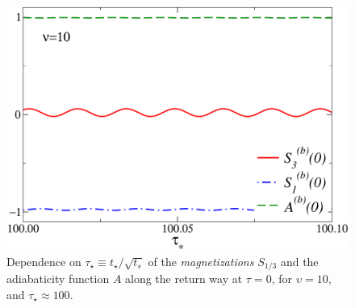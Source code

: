 \begin{figure}[!htb]
  \centering
  \includegraphics[width=0.55\columnwidth]{imm/oscillation3b.pdf}
  \caption{Dependence on $\tau_\star\equiv t_\star/\sqrt{t_s}$ of the
    {\em magnetizations} $S_{1/3}$ and the adiabaticity function $A$
    along the return way at $\tau=0$, for $\upsilon=10$, and
    $\tau_\star\approx 100$.}
  \label{lzfigs3}
\end{figure}



